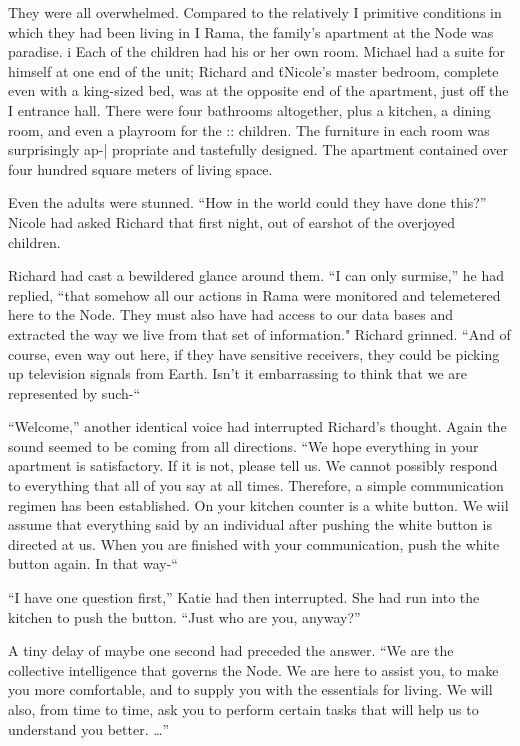 \documentclass[]{article}
\begin{document}
{They were all overwhelmed.  Compared to the relatively I primitive conditions in which they had been living in I Rama, the family’s apartment at the Node was paradise.  i Each of the children had his or her own room.  Michael had a suite for himself at one end of the unit; Richard and ťNicole’s master bedroom, complete even with a king-sized bed, was at the opposite end of the apartment, just off the I entrance hall.  There were four bathrooms altogether, plus a kitchen, a dining room, and even a playroom for the :: children.  The furniture in each room was surprisingly ap-| propriate and tastefully designed.  The apartment contained over four hundred square meters of living space.

Even the adults were stunned.  “How in the world could they have done this?” Nicole had asked Richard that first night, out of earshot of the overjoyed children.

Richard had cast a bewildered glance around them.  “I can only surmise,” he had replied, “that somehow all our actions in Rama were monitored and telemetered here to the Node.  They must also have had access to our data bases and extracted the way we live from that set of information."  Richard grinned.  “And of course, even way out here, if they have sensitive receivers, they could be picking up television signals from Earth.  Isn’t it embarrassing to think that we are represented by such-“

“Welcome,” another identical voice had interrupted Richard’s thought.  Again the sound seemed to be coming from all directions.  “We hope everything in your apartment is satisfactory.  If it is not, please tell us.  We cannot possibly respond to everything that all of you say at all times.  Therefore, a simple communication regimen has been established.  On your kitchen counter is a white button.  We wiil assume that everything said by an individual after pushing the white button is directed at us.  When you are finished with your communication, push the white button again.  In that way-“

“I have one question first,” Katie had then interrupted.  She had run into the kitchen to push the button.  “Just who are you, anyway?”

A tiny delay of maybe one second had preceded the answer.  “We are the collective intelligence that governs the Node.  We are here to assist you, to make you more comfortable, and to supply you with the essentials for living.  We will also, from time to time, ask you to perform certain tasks that will help us to understand you better.  …”

}
\end{document}
